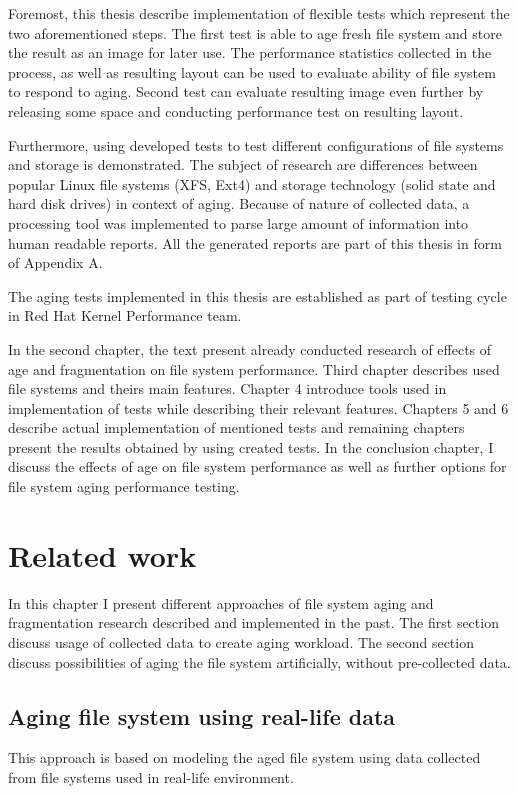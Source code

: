 \documentclass[
  color, %
  table, %
  lof,   %
  lot,   %
]{fithesis3}
\begin{document}
Foremost, this thesis describe implementation of flexible tests which represent the two aforementioned steps. The first test is able to age fresh file system and store the result as an image for later use. The performance statistics collected in the process, as well as resulting layout can be used to evaluate ability of file system to respond to aging. Second test can evaluate resulting image even further by releasing some space and conducting performance test on resulting layout. 

Furthermore, using developed tests to test different configurations of file systems and storage is demonstrated. The subject of research are differences between popular Linux file systems (XFS, Ext4) and storage technology (solid state and hard disk drives) in context of aging. Because of nature of collected data, a processing tool was implemented to parse large amount of information into human readable reports. All the generated reports are part of this thesis in form of Appendix A.

The aging tests implemented in this thesis are established as part of testing cycle in Red Hat Kernel Performance team.

In the second chapter, the text present already conducted research of effects of age and fragmentation on file system performance. Third chapter describes used file systems and theirs main features. Chapter 4 introduce tools used in implementation of tests while describing their relevant features. Chapters 5 and 6 describe actual implementation of mentioned tests and remaining chapters present the results obtained by using created tests. In the conclusion chapter, I discuss the effects of age on file system performance as well as further options for file system aging performance testing.

\chapter{Related work}
In this chapter I present different approaches of file system aging and fragmentation research described and implemented in the past. The first section discuss usage of collected data to create aging workload. The second section discuss possibilities of aging the file system artificially, without pre-collected data.

\section{Aging file system using real-life data}
This approach is based on modeling the aged file system using data collected from file systems used in real-life environment.
\end{document}
